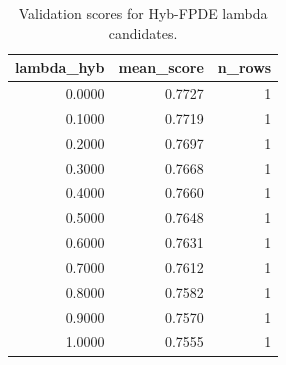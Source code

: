 \begin{table}[t]
\caption{Validation scores for Hyb-FPDE lambda candidates.}
\label{tab:lambda_distribution_computed}
\centering
\begin{tabular}{rrr}
\toprule
lambda\_hyb & mean\_score & n\_rows \\
\midrule
0.0000 & 0.7727 & 1 \\
0.1000 & 0.7719 & 1 \\
0.2000 & 0.7697 & 1 \\
0.3000 & 0.7668 & 1 \\
0.4000 & 0.7660 & 1 \\
0.5000 & 0.7648 & 1 \\
0.6000 & 0.7631 & 1 \\
0.7000 & 0.7612 & 1 \\
0.8000 & 0.7582 & 1 \\
0.9000 & 0.7570 & 1 \\
1.0000 & 0.7555 & 1 \\
\bottomrule
\end{tabular}

\end{table}
